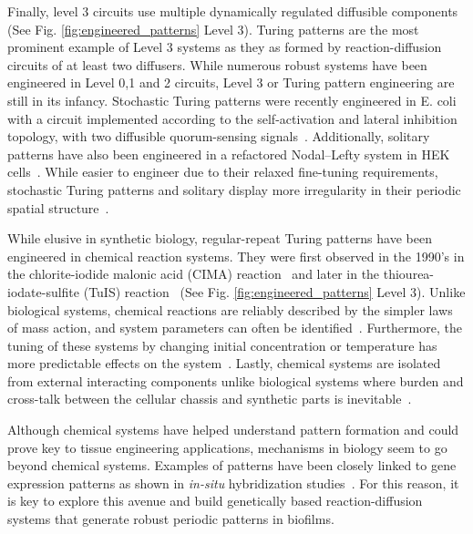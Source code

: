 Finally, level 3 circuits use multiple dynamically regulated diffusible components (See Fig. \ref{fig:engineered_patterns} Level 3).
Turing patterns are the most prominent example of Level 3 systems as they as formed by reaction-diffusion circuits of at least two diffusers.
While numerous robust systems have been engineered in Level 0,1 and 2 circuits, Level 3 or Turing pattern engineering are still in its infancy.
Stochastic Turing patterns were recently engineered in E. coli with a circuit implemented according to the self-activation and lateral inhibition topology, with two diffusible quorum-sensing signals~\parencite{Karig2018}.
Additionally, solitary patterns have also been engineered in a refactored Nodal–Lefty system in HEK cells~\parencite{Sekine2018}.
While easier to engineer due to their relaxed fine-tuning requirements, stochastic Turing patterns and solitary display more irregularity in their periodic spatial structure~\parencite{Butler2011, Karig2018,Sekine2018}.

While elusive in synthetic biology, regular-repeat Turing patterns have been engineered in chemical reaction systems.
They were first observed in the 1990's in the chlorite-iodide malonic acid (CIMA) reaction~\parencite{Castets, Lengyel1992} and later in the thiourea-iodate-sulfite (TuIS) reaction~\parencite{Horvath} (See Fig. \ref{fig:engineered_patterns} Level 3).
Unlike biological systems, chemical reactions are reliably described by the simpler laws of mass action, and system parameters can often be identified~\parencite{turanyi1994, kugler2009, Pusnik2019, Yeoh2019}.
Furthermore, the tuning of these systems by changing initial concentration or temperature has more predictable effects on the system~\parencite{Horvath, landeira2010, Asakura2011}.
Lastly, chemical systems are isolated from external interacting components unlike biological systems where burden and cross-talk between the cellular chassis and synthetic parts is inevitable~\parencite{Ceroni2015, Nielsen2016,Butzin2018, Du2020}.


Although chemical systems have helped understand pattern formation and could prove key to tissue engineering applications, mechanisms in biology seem to go beyond chemical systems.
Examples of patterns have been closely linked to gene expression patterns as shown in \textit{in-situ} hybridization studies~\parencite{Jing2006}.
For this reason, it is key to explore this avenue and build genetically based reaction-diffusion systems that generate robust periodic patterns in biofilms.


